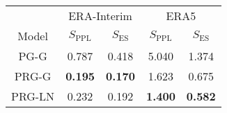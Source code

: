 
\begin{tabular}{ccccc}
\toprule
\multicolumn{1}{c}{ } & \multicolumn{2}{c}{ERA-Interim} & \multicolumn{2}{c}{ERA5} \\
\cmidrule(l{3pt}r{3pt}){2-3} \cmidrule(l{3pt}r{3pt}){4-5}
Model & $S_{\text{PPL}}$ & $S_{\text{ES}}$ & $S_{\text{PPL}}$ & $S_{\text{ES}}$\\
\midrule
PG-G   & 0.787      & 0.418       & 5.040       & 1.374\\
PRG-G  & {\bf0.195} & {\bf 0.170} & 1.623       & 0.675\\
PRG-LN & 0.232      & 0.192       & {\bf 1.400} & {\bf 0.582}\\

\bottomrule
\end{tabular}